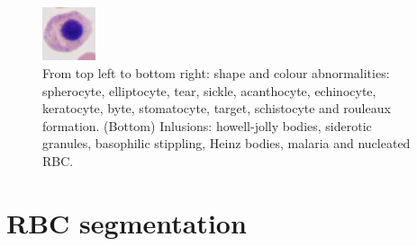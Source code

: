 {\begin{figure}[h]
		\includegraphics[width=0.14\textwidth]{images/2016_2_sitis/nucleated}\hspace{-1mm}
		\caption[RBCs examples.]{\label{fig:RBCs} From top left to bottom right: shape and colour abnormalities: spherocyte, elliptocyte, tear, sickle, acanthocyte, echinocyte, keratocyte, byte, stomatocyte, target, schistocyte and rouleaux formation. (Bottom) Inlusions: howell-jolly bodies, siderotic granules, basophilic stippling, Heinz bodies, malaria and nucleated RBC.}
	\end{figure}
	
	\section{RBC segmentation}
	\label{mva}
	
}
